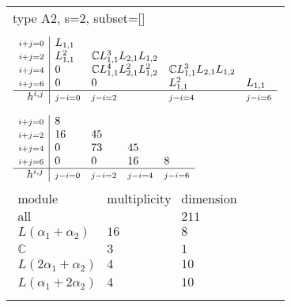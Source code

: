 \documentclass[crop,border=2mm]{standalone}
\begin{document}
\begin{tabular}{l}
{\huge type A2, s=2, subset=[]}\\ \\


$\displaystyle
\begin{array}{r|l l l l}
	{\scriptstyle i+j=0}&L_{1,1}&&&\\
	{\scriptstyle i+j=2}&L_{1,1}^{2}&\mathbb{C}L_{1,1}^{3}L_{2,1}L_{1,2}&&\\
	{\scriptstyle i+j=4}&0&\mathbb{C}L_{1,1}^{4}L_{2,1}^{2}L_{1,2}^{2}&\mathbb{C}L_{1,1}^{3}L_{2,1}L_{1,2}&\\
	{\scriptstyle i+j=6}&0&0&L_{1,1}^{2}&L_{1,1}\\
	\hline h^{i,j}&{\scriptstyle j-i=0}&{\scriptstyle j-i=2}&{\scriptstyle j-i=4}&{\scriptstyle j-i=6}
\end{array}
$ \\ \\


$\displaystyle
\begin{array}{r|l l l l}
	{\scriptstyle i+j=0}&8&&&\\
	{\scriptstyle i+j=2}&16&45&&\\
	{\scriptstyle i+j=4}&0&73&45&\\
	{\scriptstyle i+j=6}&0&0&16&8\\
	\hline h^{i,j}&{\scriptstyle j-i=0}&{\scriptstyle j-i=2}&{\scriptstyle j-i=4}&{\scriptstyle j-i=6}
\end{array}
$ \\ \\


$\displaystyle
\begin{array}{rll}
	\text{module}&\text{multiplicity}&\text{dimension} \\ \hline \text{all}&&211 \\
	L\left(\alpha_{1}+\alpha_{2}\right)&16&8\\
	\mathbb{C}&3&1\\
	L\left( 2\alpha_{1}+\alpha_{2}\right)&4&10\\
	L\left(\alpha_{1}+ 2\alpha_{2}\right)&4&10
\end{array}
$ \\ \\

\end{tabular}
\end{document}
